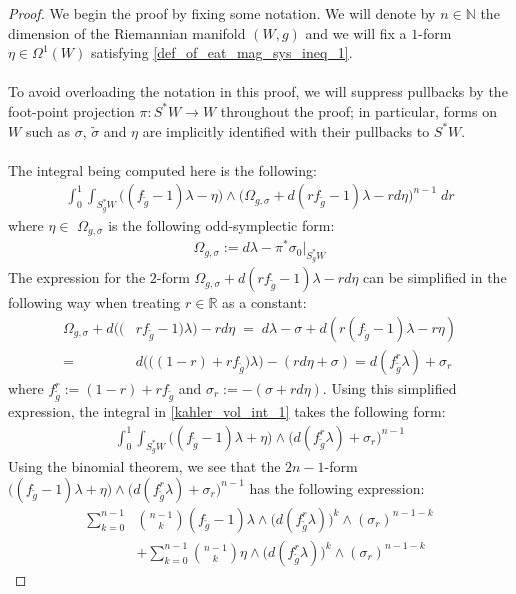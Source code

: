 \documentclass[11pt]{amsart}
\theoremstyle{plain}
\theoremstyle{definition}
\theoremstyle{remark}
\begin{document}
    \begin{proof}
        We begin the proof by fixing some notation. We will denote by $n \in \mathbb{N}$ the dimension of the Riemannian manifold $(W,g)$ and we will fix a $1$-form $\eta \in \Omega^1(W)$ satisfying \eqref{def_of_eat_mag_sys_ineq_1}.\\
        \\
To avoid overloading the notation in this proof, we will suppress pullbacks by the foot-point
projection $\pi:S^*W\rightarrow W$ throughout the proof; in particular, forms on $W$
such as $\sigma$, $\tilde \sigma$ and $\eta$ are implicitly identified with their pullbacks to
$S^*W$.\\
\\
The integral being computed here is the following:
\begin{align}\label{kahler_vol_int_1}
\int^1_0\int_{S^*_gW} \big((f_{\tilde g}-1)\lambda - \eta\big) \wedge\bigg(\Omega_{g,\sigma} + d(rf_{\tilde g}-1)\lambda - rd\eta \bigg)^{n-1} \; dr
\end{align}
where $\eta \in $ $\Omega_{g,\sigma}$ is the following odd-symplectic form:
\begin{align}
   \Omega_{g,\sigma}:= d\lambda -\pi^*\sigma_0\Big|_{S_g^*W}
\end{align}
The expression for the $2$-form $\Omega_{g,\sigma} + d(rf_{\tilde g}-1)\lambda - rd\eta$ can be simplified in the following way when treating $r \in \mathbb{R}$ as a constant:
\begin{align}
    \Omega_{g,\sigma} + d\big((&rf_{\tilde g}-1)\lambda\big) - rd\eta \; = \; d\lambda -\sigma + d(r(f_{\tilde g}-1)\lambda - r\eta ) \\\nonumber = &d\big(\big((1-r)+rf_{\tilde g} \big)\lambda \big) - (rd\eta +\sigma) = d(f^r_{\tilde g}\lambda) + \sigma_r
\end{align}
where $f^r_{\tilde g}:= (1-r) + rf_{\tilde g}$ and $\sigma_r := -(\sigma + rd\eta)$. Using this simplified expression, the integral in \eqref{kahler_vol_int_1} takes the following form:
\begin{align}
    \int^1_0\int_{S^*_gW} \big((f_{\tilde g} -1)\lambda +\eta \big)\wedge \big(d(f^r_{\tilde g}\lambda) +\sigma_r \big)^{n-1}
\end{align}
Using the binomial theorem, we see that the $2n-1$-form $\big((f_{\tilde g} -1)\lambda +\eta \big)\wedge \big(d(f^r_{\tilde g}\lambda) +\sigma_r \big)^{n-1}$ has the following expression:
\begin{align}\label{kahler_vol_int_2}
    \sum^{n-1}_{k=0}  &\binom{n-1}{k} (f_{\tilde g}-1)\lambda \wedge \big(d(f^r_{\tilde g}\lambda)\big)^k \wedge (\sigma_r)^{n-1-k} \\\nonumber &+ \sum^{n-1}_{k=0} \binom{n-1}{k} \eta \wedge \big(d(f^r_{\tilde g}\lambda)\big)^k \wedge (\sigma_r)^{n-1-k}

\end{align}
\end{proof}
\end{document}
